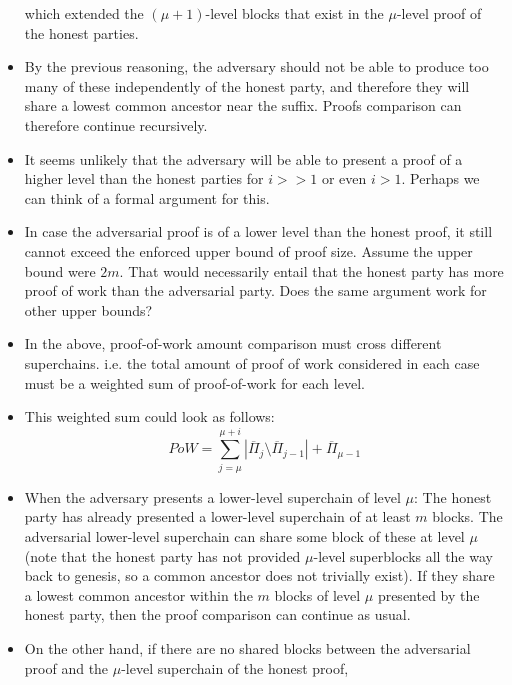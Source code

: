 \begin{itemize}
        which extended the $(\mu + 1)$-level blocks that exist in the
        $\mu$-level proof of the honest parties.
    \item
        By the previous reasoning, the adversary should not be able to produce
        too many of these independently of the honest party, and therefore they
        will share a lowest common ancestor near the suffix. Proofs comparison
        can therefore continue recursively.
    \item
        It seems unlikely that the adversary will be able to present a proof of
        a higher level than the honest parties for $i >> 1$ or even $i > 1$.
        Perhaps we can think of a formal argument for this.
    \item
        In case the adversarial proof is of a lower level than the honest
        proof, it still cannot exceed the enforced upper bound of proof size.
        Assume the upper bound were $2m$. That would necessarily entail that
        the honest party has more proof of work than the adversarial party.
        Does the same argument work for other upper bounds?
    \item
        In the above, proof-of-work amount comparison must cross different
        superchains. i.e. the total amount of proof of work considered in each
        case must be a weighted sum of proof-of-work for each level.
    \item
        This weighted sum could look as follows:
        \begin{equation}
            PoW =
            \sum_{j = \mu}^{\mu + i}
            {|\overline{\Pi}_j \setminus \overline{\Pi}_{j - 1}|}
            + \overline{\Pi}_{\mu - 1}
        \end{equation}
    \item
        When the adversary presents a lower-level superchain of level $\mu$:
        The honest party has already presented a lower-level superchain of at
        least $m$ blocks. The adversarial lower-level superchain can share some
        block of these at level $\mu$ (note that the honest party has not
        provided $\mu$-level superblocks all the way back to genesis, so a
        common ancestor does not trivially exist). If they share a lowest
        common ancestor within the $m$ blocks of level $\mu$ presented by the
        honest party, then the proof comparison can continue as usual.
    \item
        On the other hand, if there are no shared blocks between the
        adversarial proof and the $\mu$-level superchain of the honest proof,

\end{itemize}
